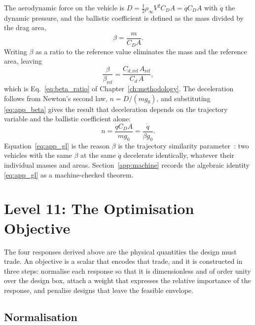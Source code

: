 The aerodynamic force on the vehicle is $D = \tfrac12\rho_\infty V^2C_DA = \dot{q}C_DA$ with $\dot{q}$ the dynamic pressure, and the ballistic coefficient is defined as the mass divided by the drag area,
\begin{equation}
    \beta = \frac{m}{C_DA} .
    \label{eq:app_beta}
\end{equation}
Writing $\beta$ as a ratio to the reference value eliminates the mass and the reference area, leaving
\begin{equation}
    \frac{\beta}{\beta_{\mathrm{ref}}} = \frac{C_{d,\mathrm{ref}}\,A_{\mathrm{ref}}}{C_d\,A} ,
    \label{eq:app_beta_ratio}
\end{equation}
which is Eq.~\eqref{eq:beta_ratio} of Chapter~\ref{ch:methodology}. The deceleration follows from Newton's second law, $n = D/(mg_0)$, and substituting \eqref{eq:app_beta} gives the result that deceleration depends on the trajectory variable and the ballistic coefficient alone:
\begin{equation}
    n = \frac{\dot{q}C_DA}{mg_0} = \frac{\dot{q}}{\beta g_0} .
    \label{eq:app_gl}
\end{equation}
Equation~\eqref{eq:app_gl} is the reason $\beta$ is the trajectory similarity parameter~\cite{AndersonHypersonic}: two vehicles with the same $\beta$ at the same $\dot{q}$ decelerate identically, whatever their individual masses and areas. Section~\ref{app:machine} records the algebraic identity \eqref{eq:app_gl} as a machine-checked theorem.

\section{Level 11: The Optimisation Objective}
\label{app:objective}

The four responses derived above are the physical quantities the design must trade. An objective is a scalar that encodes that trade, and it is constructed in three steps: normalise each response so that it is dimensionless and of order unity over the design box, attach a weight that expresses the relative importance of the response, and penalise designs that leave the feasible envelope.

\subsection{Normalisation}

